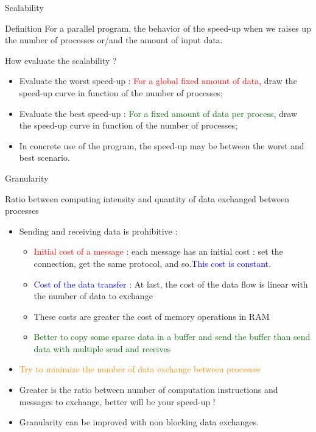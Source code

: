 \documentclass[compress,10pt,aspectratio=169]{beamer}
\begin{document}
\begin{frame}[fragile]{Scalability}
    \begin{block}{Definition}
        For a parallel program, the behavior of the speed-up when we raises up the number of processes or/and the amount 
        of input data. 
    \end{block}

    \begin{exampleblock}{How evaluate the scalability ?}
        \begin{itemize}
            \item Evaluate the worst speed-up : \textcolor{red}{For a global fixed amount of data}, draw the speed-up curve in function of the number of processes;
            \item Evaluate the best speed-up : \textcolor{DarkGreen}{For a fixed amount of data per process}, draw the speed-up curve in function of the number of processes;
            \item In concrete use of the program, the speed-up may be between the worst and best scenario.
        \end{itemize}
    \end{exampleblock}
\end{frame}

\begin{frame}[fragile]{Granularity}
    \scriptsize
    \begin{center}\small Ratio between computing intensity and quantity of data exchanged between processes\end{center}

    \begin{itemize}
        \item Sending and receiving data is prohibitive :
        \begin{itemize}
            \item {\scriptsize \textcolor{red}{Initial cost of a message} : each message has an initial cost : set the connection, 
                   get the same protocol, and so.\textcolor{blue}{This cost is constant.}} 
            \item {\scriptsize \textcolor{blue}{Cost of the data transfer} : At last, the cost of the data flow is linear with the number
            of data to exchange}
            \item {\scriptsize These costs are greater the cost of memory operations in RAM}
            \item \textcolor{DarkGreen}{\scriptsize Better to copy some sparse data in a buffer and send the buffer than send data with multiple send and receives}
        \end{itemize}
        \item \textcolor{darkorange}{Try to minimize the number of data exchange between processes}
        \item Greater is the ratio between number of computation instructions and messages to exchange, better will be your speed-up !
        \item \alert{Granularity can be improved with non blocking data exchanges}.
    \end{itemize}
\end{frame}
\end{document}
